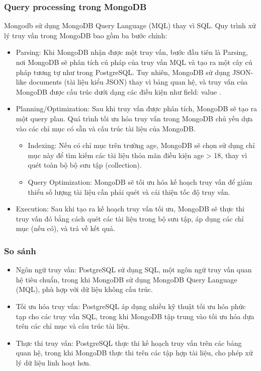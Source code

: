 \subsubsection{Query processing trong MongoDB}
\indent Mongodb sử dụng MongoDB Query Language (MQL) thay vì SQL. Quy trình xử lý truy vấn trong MongoDB bao gồm ba bước chính:
\begin{itemize}
    \item Parsing: Khi MongoDB nhận được một truy vấn, bước đầu tiên là Parsing, nơi MongoDB sẽ phân tích cú pháp của truy vấn MQL và tạo ra một cây cú pháp tương tự như trong PostgreSQL. Tuy nhiên, MongoDB sử dụng JSON-like documents (tài liệu kiểu JSON) thay vì bảng quan hệ, và truy vấn của MongoDB được cấu trúc dưới dạng các điều kiện như { field: value }.
    \item Planning/Optimization: Sau khi truy vấn được phân tích, MongoDB sẽ tạo ra một query plan. Quá trình tối ưu hóa truy vấn trong MongoDB chủ yếu dựa vào các chỉ mục có sẵn và cấu trúc tài liệu của MongoDB.
        \begin{itemize}
            \item Indexing: Nếu có chỉ mục trên trường age, MongoDB sẽ chọn sử dụng chỉ mục này để tìm kiếm các tài liệu thỏa mãn điều kiện age > 18, thay vì quét toàn bộ bộ sưu tập (collection).
            \item Query Optimization: MongoDB sẽ tối ưu hóa kế hoạch truy vấn để giảm thiểu số lượng tài liệu cần phải quét và cải thiện tốc độ truy vấn.
        \end{itemize}
    \item Execution: Sau khi tạo ra kế hoạch truy vấn tối ưu, MongoDB sẽ thực thi truy vấn đó bằng cách quét các tài liệu trong bộ sưu tập, áp dụng các chỉ mục (nếu có), và trả về kết quả.
\end{itemize}

\subsubsection{So sánh}
\begin{itemize}
    \item Ngôn ngữ truy vấn: PostgreSQL sử dụng SQL, một ngôn ngữ truy vấn quan hệ tiêu chuẩn, trong khi MongoDB sử dụng MongoDB Query Language (MQL), phù hợp với dữ liệu không cấu trúc.
    \item Tối ưu hóa truy vấn: PostgreSQL áp dụng nhiều kỹ thuật tối ưu hóa phức tạp cho các truy vấn SQL, trong khi MongoDB tập trung vào tối ưu hóa dựa trên các chỉ mục và cấu trúc tài liệu.
    \item Thực thi truy vấn: PostgreSQL thực thi kế hoạch truy vấn trên các bảng quan hệ, trong khi MongoDB thực thi trên các tập hợp tài liệu, cho phép xử lý dữ liệu linh hoạt hơn.
\end{itemize}


